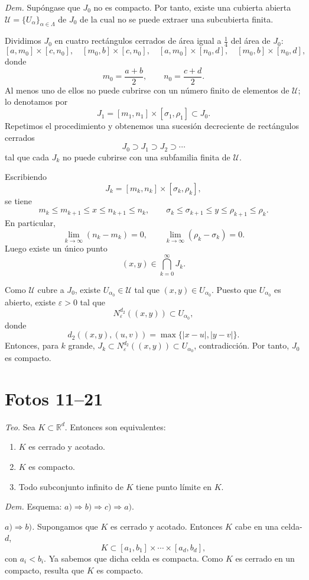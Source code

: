 \documentclass[12pt]{article}
\begin{document}
\textit{Dem.} Supóngase que $J_0$ no es compacto.
Por tanto, existe una cubierta abierta $\mathcal U=\{U_\alpha\}_{\alpha\in\Lambda}$ de $J_0$ de la cual no se puede extraer una subcubierta finita.

Dividimos $J_0$ en cuatro rectángulos cerrados de área igual a $\frac14$ del área de $J_0$:
\[
[a,m_0]\times[c,n_0],\quad [m_0,b]\times[c,n_0],\quad [a,m_0]\times[n_0,d],\quad [m_0,b]\times[n_0,d],
\]
donde
\[
m_0=\frac{a+b}{2},\qquad n_0=\frac{c+d}{2}.
\]
Al menos uno de ellos no puede cubrirse con un número finito de elementos de $\mathcal U$; lo denotamos por
\[
J_1=[m_1,n_1]\times[\sigma_1,\rho_1]\subset J_0.
\]
Repetimos el procedimiento y obtenemos una sucesión decreciente de rectángulos cerrados
\[
J_0\supset J_1\supset J_2\supset\cdots
\]
tal que cada $J_k$ no puede cubrirse con una subfamilia finita de $\mathcal U$.

Escribiendo
\[
J_k=[m_k,n_k]\times[\sigma_k,\rho_k],
\]
se tiene
\[
m_k\le m_{k+1}\le x\le n_{k+1}\le n_k,\qquad
\sigma_k\le \sigma_{k+1}\le y\le \rho_{k+1}\le \rho_k.
\]
En particular,
\[
\lim_{k\to\infty}(n_k-m_k)=0,\qquad \lim_{k\to\infty}(\rho_k-\sigma_k)=0.
\]
Luego existe un único punto
\[
(x,y)\in\bigcap_{k=0}^\infty J_k.
\]

Como $\mathcal U$ cubre a $J_0$, existe $U_{\alpha_0}\in\mathcal U$ tal que $(x,y)\in U_{\alpha_0}$.
Puesto que $U_{\alpha_0}$ es abierto, existe $\varepsilon>0$ tal que
\[
N_\varepsilon^{d_2}((x,y))\subset U_{\alpha_0},
\]
donde
\[
d_2((x,y),(u,v))=\max\{|x-u|,|y-v|\}.
\]
Entonces, para $k$ grande, $J_k\subset N_\varepsilon^{d_2}((x,y))\subset U_{\alpha_0}$, contradicción.
Por tanto, $J_0$ es compacto.

\section*{Fotos 11--21}

\textit{Teo.} Sea $K\subset\mathbb R^d$. Entonces son equivalentes:
\begin{enumerate}[label=\alph*)]
    \item $K$ es cerrado y acotado.
    \item $K$ es compacto.
    \item Todo subconjunto infinito de $K$ tiene punto límite en $K$.
\end{enumerate}

\textit{Dem.} Esquema: $a)\Rightarrow b)\Rightarrow c)\Rightarrow a)$.

\textit{$a)\Rightarrow b)$.} Supongamos que $K$ es cerrado y acotado.
Entonces $K$ cabe en una celda-$d$,
\[
K\subset [a_1,b_1]\times\cdots\times[a_d,b_d],
\]
con $a_i<b_i$.
Ya sabemos que dicha celda es compacta.
Como $K$ es cerrado en un compacto, resulta que $K$ es compacto.
\end{document}
